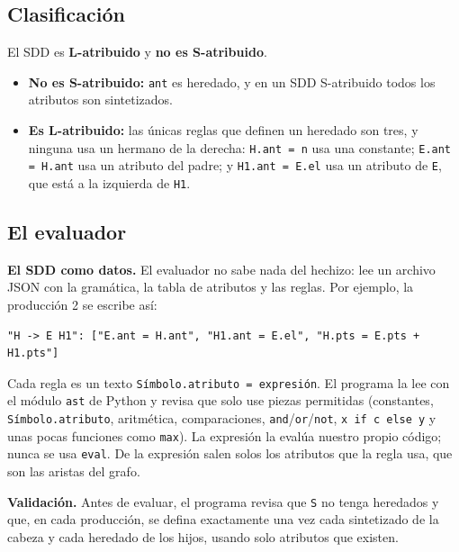 \documentclass[11pt,a4paper]{article}
\newcommand{\code}[1]{\texttt{#1}}
\begin{document}
\subsection{Clasificación}

El SDD es \textbf{L-atribuido} y \textbf{no es S-atribuido}.

\begin{itemize}
  \item \textbf{No es S-atribuido:} \code{ant} es heredado, y en un SDD S-atribuido todos los atributos son sintetizados.
  \item \textbf{Es L-atribuido:} las únicas reglas que definen un heredado son tres, y ninguna usa un hermano de la derecha: \code{H.ant = n} usa una constante; \code{E.ant = H.ant} usa un atributo del padre; y \code{H1.ant = E.el} usa un atributo de \code{E}, que está a la izquierda de \code{H1}.
\end{itemize}

\subsection{El evaluador}

\textbf{El SDD como datos.} El evaluador no sabe nada del hechizo: lee un archivo JSON con la gramática, la tabla de atributos y las reglas. Por ejemplo, la producción 2 se escribe así:

\begin{Verbatim}
"H -> E H1": ["E.ant = H.ant", "H1.ant = E.el", "H.pts = E.pts + H1.pts"]
\end{Verbatim}

Cada regla es un texto \code{Símbolo.atributo = expresión}. El programa la lee con el módulo \code{ast} de Python y revisa que solo use piezas permitidas (constantes, \code{Símbolo.atributo}, aritmética, comparaciones, \code{and}/\code{or}/\code{not}, \code{x if c else y} y unas pocas funciones como \code{max}). La expresión la evalúa nuestro propio código; nunca se usa \code{eval}. De la expresión salen solos los atributos que la regla usa, que son las aristas del grafo.

\textbf{Validación.} Antes de evaluar, el programa revisa que \code{S} no tenga heredados y que, en cada producción, se defina exactamente una vez cada sintetizado de la cabeza y cada heredado de los hijos, usando solo atributos que existen.
\end{document}
